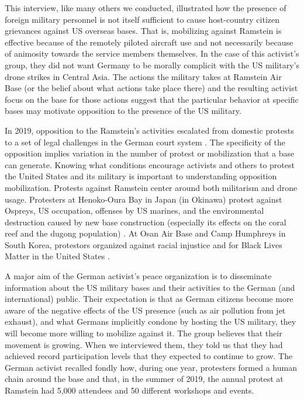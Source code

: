 This interview, like many others we conducted, illustrated how the presence of foreign military personnel is not itself sufficient to cause host-country citizen grievances against US overseas bases. That is, mobilizing against Ramstein is effective because of the remotely piloted aircraft use and not necessarily because of animosity towards the service members themselves. In the case of this activist's group, they did not want Germany to be morally complicit with the US military's drone strikes in Central Asia. The actions the military takes at Ramstein Air Base (or the belief about what actions take place there) and the resulting activist focus on the base for those actions suggest that the particular behavior at specific bases may motivate opposition to the presence of the US military. 

In 2019, opposition to the Ramstein's activities escalated from domestic protests to a set of legal challenges in the German court system \cite{Kloeckner2019,Reuters2019}. The specificity of the opposition implies variation in the number of protest or mobilization that a base can generate. Knowing what conditions encourage activists and others to protest the United States and its military is important to understanding opposition mobilization.  Protests against Ramstein center around both militarism and drone usage. Protesters at Henoko-Oura Bay in Japan (in Okinawa) protest against Ospreys, US occupation, offenses by US marines, and the environmental destruction caused by new base construction (especially its effects on the coral reef and the dugong population) \cite{Hibbett2019}. At Osan Air Base and Camp Humphreys in South Korea, protestors organized against racial injustice and for Black Lives Matter in the United States \cite{Sisk2020}. 

A major aim of the German activist's peace organization is to disseminate information about the US military bases and their activities to the German (and international) public. Their expectation is that as German citizens become more aware of the negative effects of the US presence (such as air pollution from jet exhaust), and what Germans implicitly condone by hosting the US military, they will become more willing to mobilize against it. The group believes that their movement is growing. When we interviewed them, they told us that they had achieved record participation levels that they expected to continue to grow. The German activist recalled fondly how, during one year, protesters formed a human chain around the base and that, in the summer of 2019, the annual protest at Ramstein had 5,000 attendees and 50 different workshops and events.  

